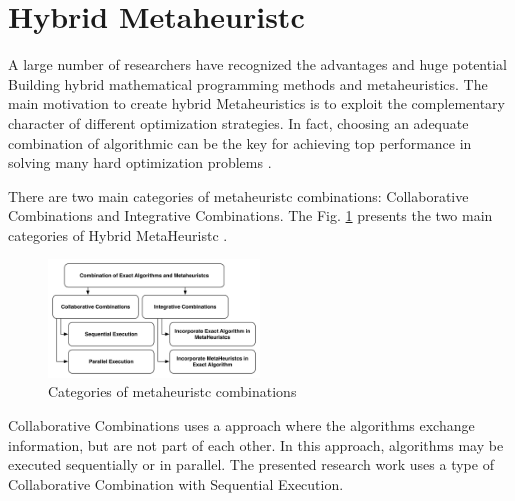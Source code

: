 \section{Hybrid Metaheuristc}


A large  number of researchers have recognized the advantages and huge potential Building
hybrid mathematical programming methods and metaheuristics.
The main motivation to create hybrid Metaheuristics is to exploit the complementary character of different optimization strategies. In fact, choosing an adequate combination of algorithmic can be the key for achieving top performance in solving many hard optimization problems \cite{Puchinger2005} \cite{Blum2012}.


There are two main categories of metaheuristc combinations: Collaborative Combinations and Integrative Combinations. The Fig. \ref{fig:metaheuristc} presents the two main categories of Hybrid MetaHeuristc \cite{Puchinger2005}.

\begin{figure}[h]
\includegraphics[width=0.5\textwidth]{./images/metaheuristcs.png}
\caption{Categories of metaheuristc combinations \cite{Puchinger2005} }
\label{fig:metaheuristc}
\end{figure}

Collaborative Combinations uses a approach where the  algorithms exchange information, but are not part of each other. In this approach,  algorithms may be executed sequentially or in parallel. The presented research work uses a type of  Collaborative Combination with Sequential Execution.

